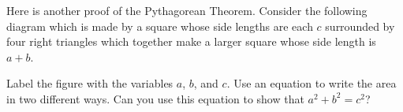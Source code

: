 \documentclass[nooutcomes,noauthor, handout]{ximera}
\begin{document}
\begin{problem}
Here is another proof of the Pythagorean Theorem. Consider the following diagram which is made by a square whose side lengths are each $c$ surrounded by four right triangles which together make a larger square whose side length is $a+b$.
\begin{image} \end{image}

Label the figure with the variables $a$, $b$, and $c$. Use an equation to write the area in two different ways. Can you use this equation to show that $a^2 + b^2 = c^2$?
\end{problem}

\newpage
\end{document}
